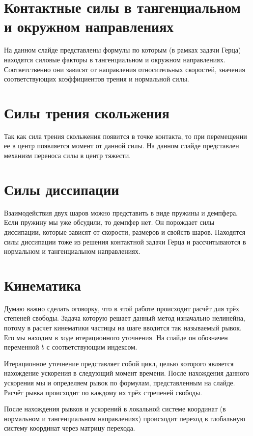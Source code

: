 \documentclass[a4paper]{article}
\begin{document}
\section{Контактные силы в тангенциальном и окружном направлениях}

На данном слайде представлены формулы по которым (в рамках задачи Герца) находятся силовые факторы в тангенциальном и окружном направлениях. 
Соответственно они зависят от направления относительных скоростей, значения соответствующих коэффициентов трения и нормальной силы.

\section{Силы трения скольжения}

Так как сила трения скольжения появится в точке контакта, то при перемещении ее в центр появляется момент от данной силы.
На данном слайде представлен механизм переноса силы в центр тяжести.

\section{Силы диссипации}

Взаимодействия двух шаров можно представить в виде пружины и демпфера.
Если пружину мы уже обсудили, то демпфер нет.
Он порождает силы диссипации, которые зависят от скорости, размеров и свойств шаров.
Находятся силы диссипации тоже из решения контактной задачи Герца и рассчитываются в нормальном и тангенциальном направлениях.

\section{Кинематика}

Думаю важно сделать оговорку, что в этой работе происходит расчёт для трёх степеней свободы.
Задача которую решает данный метод изначально нелинейна, потому в расчет кинематики частицы на шаге вводится так называемый рывок.
Его мы находим в ходе итерационного уточнения.
На слайде он обозначен переменной $b$ с соответствующим индексом.

Итерационное уточнение представляет собой цикл, целью которого является нахождение ускорения в следующий момент времени.
После нахождения данного ускорения мы и определяем рывок по формулам, представленным на слайде.
Расчёт рывка происходит по каждому их трёх стрепеней свободы.

После нахождения рывков и ускорений в локальной системе координат (в нормальном и тангенциальном направлениях) происходит переход в глобальную систему координат через матрицу перехода.
\end{document}
